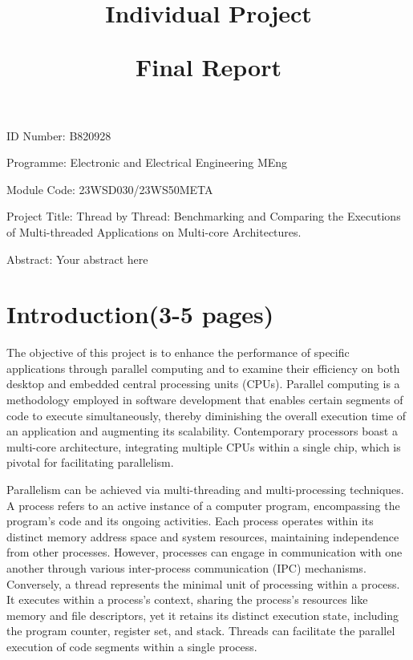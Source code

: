 \documentclass[12pt]{article}
\title{Individual Project

Final Report}
\author{}
\date{}
\begin{document}
\maketitle

ID Number: B820928

Programme: Electronic and Electrical Engineering MEng

Module Code: 23WSD030/23WS50META

Project Title: Thread by Thread: Benchmarking and Comparing the Executions of Multi-threaded Applications on Multi-core Architectures.

Abstract:
Your abstract here

\newpage
\tableofcontents
\newpage

\section{Introduction(3-5 pages)}
The objective of this project is to enhance the performance of specific applications through parallel computing and to examine their efficiency on both desktop and embedded central processing units (CPUs). Parallel computing is a methodology employed in software development that enables certain segments of code to execute simultaneously, thereby diminishing the overall execution time of an application and augmenting its scalability. Contemporary processors boast a multi-core architecture, integrating multiple CPUs within a single chip, which is pivotal for facilitating parallelism.  

Parallelism can be achieved via multi-threading and multi-processing techniques. A process refers to an active instance of a computer program, encompassing the program's code and its ongoing activities. Each process operates within its distinct memory address space and system resources, maintaining independence from other processes. However, processes can engage in communication with one another through various inter-process communication (IPC) mechanisms. Conversely, a thread represents the minimal unit of processing within a process. It executes within a process's context, sharing the process’s resources like memory and file descriptors, yet it retains its distinct execution state, including the program counter, register set, and stack. Threads can facilitate the parallel execution of code segments within a single process. 
\end{document}
